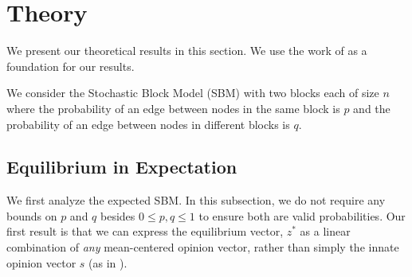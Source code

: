 \pagebreak
\section{Theory}\label{sec:theory}
We present our theoretical results in this section.
We use the work of \cite{chitra20analyzing}
as a foundation for our results.

We consider the Stochastic Block Model (SBM)
with two blocks each of size $n$ where the probability
of an edge between nodes in the same block is $p$
and the probability of an edge between nodes in different
blocks is $q$.

\subsection{Equilibrium in Expectation}
We first analyze the expected SBM.
In this subsection, we do not require any bounds on $p$ and $q$
besides $0 \leq p,q \leq 1$ to ensure both are valid probabilities. Our first result is that we can express the equilibrium vector, $z^*$ as a linear combination of \emph{any} mean-centered opinion vector, rather than simply the innate opinion vector $s$
(as in \cite{chitra20analyzing}).

